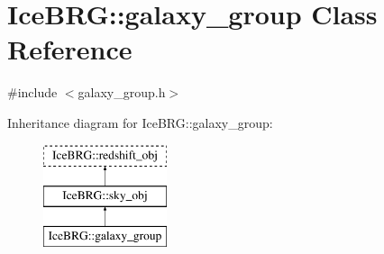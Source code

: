 \hypertarget{classIceBRG_1_1galaxy__group}{}\section{Ice\+B\+R\+G\+:\+:galaxy\+\_\+group Class Reference}
\label{classIceBRG_1_1galaxy__group}


{\ttfamily \#include $<$galaxy\+\_\+group.\+h$>$}

Inheritance diagram for Ice\+B\+R\+G\+:\+:galaxy\+\_\+group\+:\begin{figure}[H]
\begin{center}
\leavevmode
\includegraphics[height=3.000000cm]{classIceBRG_1_1galaxy__group}
\end{center}
\end{figure}
